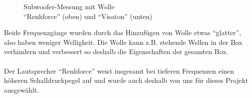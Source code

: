 \begin{figure} [H]
	\centering
	\quad
	\caption{Subwoofer-Messung mit Wolle\\ \enquote{Renkforce} (oben) und \enquote{Visaton} (unten)}
	\label{fig:5.3.3.3}
\end{figure}
Beide Frequenzgänge wurden durch das Hinzufügen von Wolle etwas \enquote{glatter}, also haben weniger Welligkeit.
Die Wolle kann z.B. stehende Wellen in der Box verhindern und verbessert so deshalb die Eigenschaften der gesamten Box.\\ \\	%
Der Lautsprecher \enquote{Renkforce} weist insgesamt bei tieferen Frequenzen einen höheren Schalldruckpegel auf und wurde auch deshalb von uns für dieses Projekt ausgewählt.



